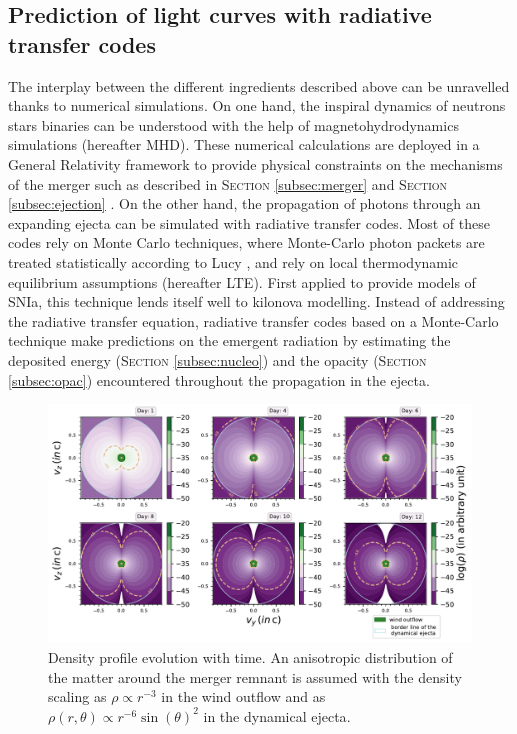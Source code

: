 \documentclass[a4paper, twoside, 11pt]{article}
\numberwithin{equation}{section}
\begin{document}
\subsection{Prediction of light curves with radiative transfer codes}
\label{subsec:codes}
\hspace{\parindent} The interplay between the different ingredients described above can be unravelled thanks to numerical simulations. On one hand, the inspiral dynamics of neutrons stars binaries can be understood with the help of magnetohydrodynamics simulations (hereafter MHD). These numerical calculations are deployed in a General Relativity framework to provide physical constraints on the mechanisms of the merger such as described in S\textsc{ection} \ref{subsec:merger} and S\textsc{ection}  \ref{subsec:ejection} \cite{MHD}. On the other hand, the propagation of photons through an expanding ejecta can be simulated with radiative transfer codes. Most of these codes rely on Monte Carlo techniques, where Monte-Carlo photon packets are treated statistically according to Lucy \cite{Lucy_MonteCarlo}, and rely on local thermodynamic equilibrium  assumptions (hereafter LTE). First applied to provide models of  SNIa, this technique lends itself well to kilonova modelling. Instead of addressing the radiative transfer equation, radiative transfer codes based on a Monte-Carlo technique make predictions on the emergent radiation by estimating  the deposited energy (S\textsc{ection} \ref{subsec:nucleo}) and the opacity (S\textsc{ection} \ref{subsec:opac}) encountered throughout the propagation in the ejecta. \\
\begin{figure}[h!]
\centering
\includegraphics[width=\textwidth]{pictures/mapDensity_N100.pdf}
\caption[Time evolution of the density profile in kilonova]{Density profile evolution with time. An anisotropic distribution of the matter around the merger remnant is assumed with the density scaling as $\rho \propto r^{-3}$ in the wind outflow and as $\rho(r,\theta) \propto r^{-6} \sin(\theta)^2$ in the dynamical ejecta\cite{matter_distribution}. }
\label{fig:mapDens}
\end{figure}
\end{document}
